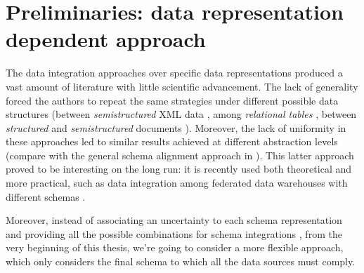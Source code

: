 \section{Preliminaries: data representation dependent approach}\label{sec:oldschooldi}
The data integration approaches over specific data representations produced a vast amount of literature with little scientific advancement. The lack of generality forced the authors to repeat the same strategies under different possible data structures (between \textit{semistructured} XML data \cite{APoggi06}, among \textit{relational tables} \cite{Magnani09}, between \textit{structured} and \textit{semistructured}  documents \cite{ManolescuFK01,Lu2006,Magnani06}). Moreover, the lack of uniformity in these approaches led to similar results achieved at different abstraction levels (compare \cite{GolfarelliMPRT12} with the general schema alignment approach in \cite{euzenat2013d}). This latter approach proved to be interesting on the long run: it is recently used both theoretical \cite{VirgilioMT15} and more practical, such as data integration among federated data warehouses with different schemas  \cite{GolfarelliMPRT12}. 

Moreover, instead of associating an uncertainty to each schema representation and providing all the possible combinations for schema integrations \cite{Magnani09}, from the very beginning of this thesis, we’re going to consider a more flexible approach, which only considers the final schema to which all the data sources must comply. 


